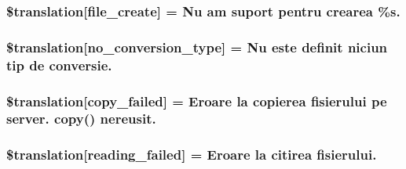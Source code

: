 \subsubsection[{\$translation}]{\setlength{\rightskip}{0pt plus 5cm}\$translation\mbox{[}\textquotesingle{}file\+\_\+create\textquotesingle{}\mbox{]} = \textquotesingle{}Nu am suport pentru crearea \%s.\textquotesingle{}}\label{class_8upload_8ro___r_o_8php_a1ecb4673e4fb69e06b3f20b65cecf30a}
\hypertarget{class_8upload_8ro___r_o_8php_a4712d7ec28e9a7f17eb3338af2358363}{}
\subsubsection[{\$translation}]{\setlength{\rightskip}{0pt plus 5cm}\$translation\mbox{[}\textquotesingle{}no\+\_\+conversion\+\_\+type\textquotesingle{}\mbox{]} = \textquotesingle{}Nu este definit niciun tip de conversie.\textquotesingle{}}\label{class_8upload_8ro___r_o_8php_a4712d7ec28e9a7f17eb3338af2358363}
\hypertarget{class_8upload_8ro___r_o_8php_a783c9358bcf54a054545b50098bc679b}{}
\subsubsection[{\$translation}]{\setlength{\rightskip}{0pt plus 5cm}\$translation\mbox{[}\textquotesingle{}copy\+\_\+failed\textquotesingle{}\mbox{]} = \textquotesingle{}Eroare la copierea fisierului pe server. copy() nereusit.\textquotesingle{}}\label{class_8upload_8ro___r_o_8php_a783c9358bcf54a054545b50098bc679b}
\hypertarget{class_8upload_8ro___r_o_8php_a01bea14c9fd5f353f62db44beabfcd42}{}
\subsubsection[{\$translation}]{\setlength{\rightskip}{0pt plus 5cm}\$translation\mbox{[}\textquotesingle{}reading\+\_\+failed\textquotesingle{}\mbox{]} = \textquotesingle{}Eroare la citirea fisierului.\textquotesingle{}}\label{class_8upload_8ro___r_o_8php_a01bea14c9fd5f353f62db44beabfcd42}
